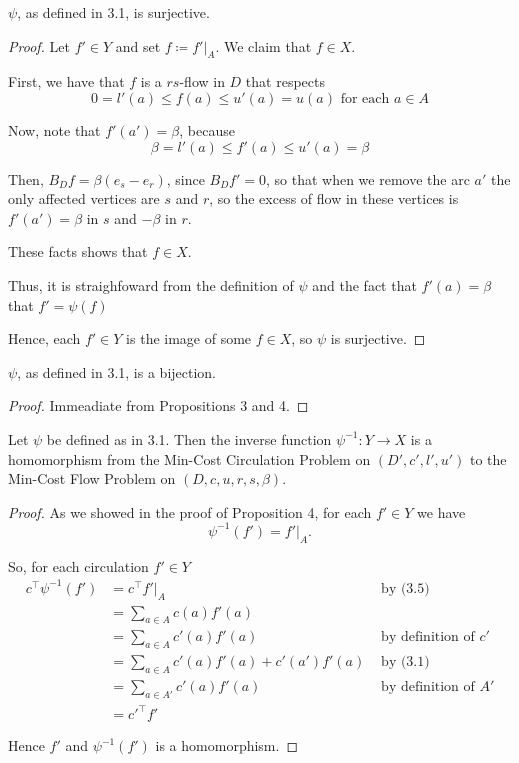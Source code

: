 \documentclass[a4paper,10pt, leqno]{article}
\newcommand{\restr}[1]{|_{#1}}
\theoremstyle{definition}
\begin{document}
\begin{proposition}
 $\psi$, as defined in 3.1, is surjective.
\end{proposition}
\begin{proof}
 Let $f' \in Y$ and set $f \coloneqq f'\restr{A}$. We claim that $f \in X$.
 
First, we have that $f$ is a $rs$-flow in $D$ that respects 
 $$0 = l'(a) \leq f(a) \leq u'(a) = u(a) \text{ for each } a \in A$$ 
 
 Now, note that $f'(a') = \beta$, because
 $$
 \beta = l'(a) \leq f'(a) \leq u'(a) = \beta
 $$
 
Then, $B_Df = \beta(e_s - e_r)$, since $B_Df' = 0$, so that when we remove the arc $a'$ the only affected vertices are $s$ and $r$, so the excess of flow in these vertices is $f'(a') = \beta$ in $s$ and $-\beta$ in $r$.

These facts shows that $f \in X$.

 Thus, it is straighfoward from the definition of $\psi$ and the fact that $f'(a) = \beta$ that $f' = \psi(f)$

 Hence, each $f' \in Y$ is the image of some $f \in X$, so $\psi$ is surjective.
\end{proof}

\begin{lemma}
 $\psi$, as defined in 3.1, is a bijection.
\end{lemma}
\begin{proof}
 Immeadiate from Propositions 3 and 4.
\end{proof}

\begin{lemma}
Let $\psi$ be defined as in 3.1. Then the inverse function $\psi^{-1} : Y \to X $ is a homomorphism from the Min-Cost Circulation Problem on $(D', c', l', u')$ to the Min-Cost Flow Problem on $(D, c, u, r, s, \beta)$.
\end{lemma}
\begin{proof}
 As we showed in the proof of Proposition 4, for each $f' \in Y$ we have 
 \begin{equation*}
 \tag{3.5} \psi^{-1}(f') = f'\restr{A}.
 \end{equation*}

 
 So, for each circulation $f' \in Y$
 \begin{align*}
  c^\intercal \psi^{-1}(f') &= c^\intercal f'\restr{A} &\text{ by (3.5)} \\
  &= \sum_{a \in A}{c(a)f'(a)} \\
  &= \sum_{a \in A}{c'(a)f'(a)} &\text{ by definition of } c' \\
  &= \sum_{a \in A}{c'(a)f'(a)} + c'(a')f'(a) &\text{ by (3.1)} \\
  &= \sum_{a \in A'}{c'(a)f'(a)} &\text{ by definition of } A' \\
  &= {c'}^\intercal f'
 \end{align*}

Hence $f'$ and $\psi^{-1}(f')$ is a homomorphism. 
\end{proof}
\end{document}
